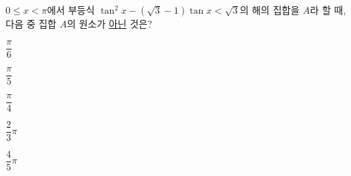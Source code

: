 $0\le x<\pi$에서 부등식 $\tan^2 x-(\sqrt{3}-1)\tan x<\sqrt{3}$의 해의 집합을 $A$라 할 때, 다음 중 집합 $A$의 원소가 \underline{아닌} 것은?
\begin{choices32}{\rule[-3ex]{0pt}{8ex}$\dfrac{\pi}{6}$}{\rule[-3ex]{0pt}{8ex}$\dfrac{\pi}{5}$}{\rule[-3ex]{0pt}{8ex}$\dfrac{\pi}{4}$}{\rule[-3ex]{0pt}{8ex}$\dfrac{2}{3}\pi$}{\rule[-3ex]{0pt}{8ex}$\dfrac{4}{5}\pi$}\end{choices32}
